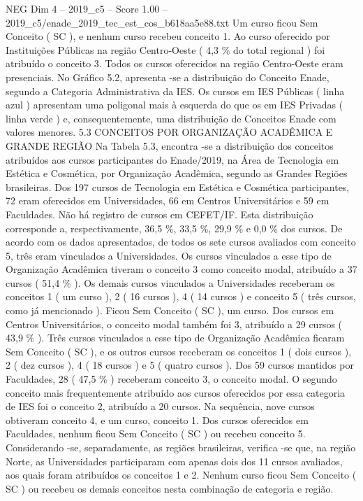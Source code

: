 \begin{textsample}{NEG Dim 4 – 2019\_c5 – Score 1.00 – 2019\_c5/enade\_2019\_tec\_est\_cos\_b618aa5e88.txt}
Um curso ficou Sem Conceito ( SC ), e nenhum curso recebeu conceito 1.
Ao curso oferecido por Instituições Públicas na região Centro-Oeste ( 4,3 \% do total regional ) foi atribuído o conceito 3.
Todos os cursos oferecidos na região Centro-Oeste eram presenciais.
No Gráfico 5.2, apresenta -se a distribuição do Conceito Enade, segundo a Categoria Administrativa da IES.
Os cursos em IES Públicas ( linha azul ) apresentam uma poligonal mais à esquerda do que os em IES Privadas ( linha verde ) e, consequentemente, uma distribuição de Conceitos Enade com valores menores. 5.3 CONCEITOS POR ORGANIZAÇÃO ACADÊMICA E GRANDE REGIÃO Na Tabela 5.3, encontra -se a distribuição dos conceitos atribuídos aos cursos participantes do Enade/2019, na Área de Tecnologia em Estética e Cosmética, por Organização Acadêmica, segundo as Grandes Regiões brasileiras.
Dos 197 cursos de Tecnologia em Estética e Cosmética participantes, 72 eram oferecidos em Universidades, 66 em Centros Universitários e 59 em Faculdades.
Não há registro de cursos em CEFET/IF.
Esta distribuição corresponde a, respectivamente, 36,5 \%, 33,5 \%, 29,9 \% e 0,0 \% dos cursos.
De acordo com os dados apresentados, de todos os sete cursos avaliados com conceito 5, três eram vinculados a Universidades.
Os cursos vinculados a esse tipo de Organização Acadêmica tiveram o conceito 3 como conceito modal, atribuído a 37 cursos ( 51,4 \% ).
Os demais cursos vinculados a Universidades receberam os conceitos 1 ( um curso ), 2 ( 16 cursos ), 4 ( 14 cursos ) e conceito 5 ( três cursos, como já mencionado ).
Ficou Sem Conceito ( SC ), um curso.
Dos cursos em Centros Universitários, o conceito modal também foi 3, atribuído a 29 cursos ( 43,9 \% ).
Três cursos vinculados a esse tipo de Organização Acadêmica ficaram Sem Conceito ( SC ), e os outros cursos receberam os conceitos 1 ( dois cursos ), 2 ( dez cursos ), 4 ( 18 cursos ) e 5 ( quatro cursos ).
Dos 59 cursos mantidos por Faculdades, 28 ( 47,5 \% ) receberam conceito 3, o conceito modal.
O segundo conceito mais frequentemente atribuído aos cursos oferecidos por essa categoria de IES foi o conceito 2, atribuído a 20 cursos.
Na sequência, nove cursos obtiveram conceito 4, e um curso, conceito 1.
Dos cursos oferecidos em Faculdades, nenhum ficou Sem Conceito ( SC ) ou recebeu conceito 5.
Considerando -se, separadamente, as regiões brasileiras, verifica -se que, na região Norte, as Universidades participaram com apenas dois dos 11 cursos avaliados, aos quais foram atribuídos os conceitos 1 e 2.
Nenhum curso ficou Sem Conceito ( SC ) ou recebeu os demais conceitos nesta combinação de categoria e região.

\end{textsample}
